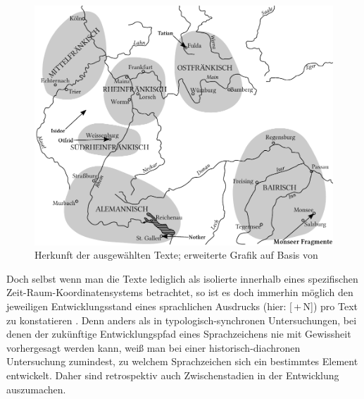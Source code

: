 \begin{figure}
\includegraphics[width=\textwidth]{images/koenig-atlas.pdf}
\caption {Herkunft der ausgewählten Texte; erweiterte Grafik auf Basis von  \textcite[66]{Konig2015}\label{abb:schreiborte}}
\end{figure}

Doch selbst wenn man die Texte lediglich als isolierte  innerhalb eines spezifischen Zeit-Raum-Koordinatensystems \parencite[157]{Leiss2000} betrachtet, so ist es doch immerhin möglich den jeweiligen Entwicklungsstand eines sprachlichen Ausdrucks (hier: [\,+\,N]) pro Text
zu konstatieren \parencite[vgl. zu diesem Vorgehen auch][29]{Himmelmann1997}. Denn anders als in typologisch-synchronen Untersuchungen, bei denen der zukünftige Entwicklungspfad eines Sprachzeichens nie mit Gewissheit vorhergesagt werden kann, weiß man bei einer historisch-diachronen Untersuchung zumindest, zu welchem  Sprachzeichen sich ein bestimmtes Element entwickelt. Daher sind retrospektiv auch Zwischenstadien in der Entwicklung auszumachen.      


